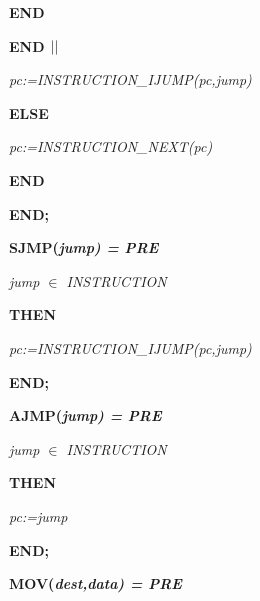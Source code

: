 \begin{sloppypar}
\hspace*{0.40in}\bf END

\hspace*{0.30in}\bf END  $\mbox{$\mid\mid$}$ 

\hspace*{0.30in}\it pc\rm :=\it INSTRUCTION\_IJUMP\rm (\it pc\rm ,\it jump\rm )

\hspace*{0.20in}\bf ELSE

\hspace*{0.30in}\it pc\rm :=\it INSTRUCTION\_NEXT\rm (\it pc\rm )

\hspace*{0.20in}\bf END

\hspace*{0.10in}\bf END\rm ;

\hspace*{0.10in}\bf SJMP\rm (\it jump\rm ) \rm = \bf PRE

\hspace*{0.20in}\it jump $\in$  \it INSTRUCTION

\hspace*{0.10in}\bf THEN

\hspace*{0.20in}\it pc\rm :=\it INSTRUCTION\_IJUMP\rm (\it pc\rm ,\it jump\rm )

\hspace*{0.10in}\bf END\rm ;

\hspace*{0.10in}\bf AJMP\rm (\it jump\rm ) \rm = \bf PRE

\hspace*{0.20in}\it jump $\in$  \it INSTRUCTION

\hspace*{0.10in}\bf THEN

\hspace*{0.20in}\it pc\rm :=\it jump

\hspace*{0.10in}\bf END\rm ;

\hspace*{0.10in} 

\hspace*{0.10in}

\hspace*{0.10in}  

\hspace*{0.10in}

\hspace*{0.10in}\bf MOV\rm (\it dest\rm ,\it data\rm ) \rm = \bf PRE


\end{sloppypar}
